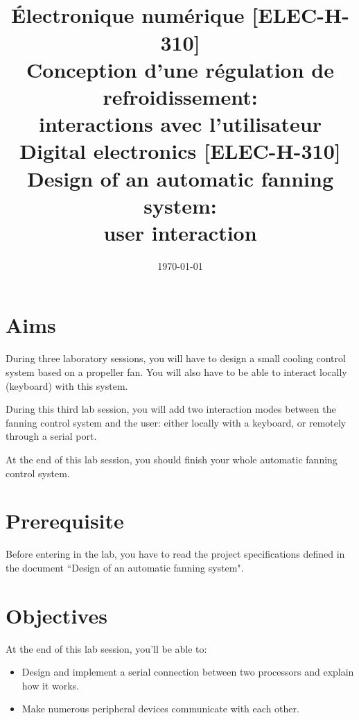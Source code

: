 \documentclass[11pt,a4paper]{article}
\date{\vspace{-1.7cm}\mydate\today}
\title{\vspace{-2cm}\labonumber\\ Électronique numérique [ELEC-H-310]\\Conception d'une régulation de refroidissement: \\ interactions avec l'utilisateur\ifthenelse{\boolean{corrige}}{~\\Corrigé}{}}
\title{\vspace{-2cm}\labonumber \\ Digital electronics [ELEC-H-310]\\Design of an automatic fanning system: \\ user interaction\ifthenelse{\boolean{corrige}}{~\\Corrigé}{}}
\theoremstyle{definition}%
\begin{document}
\pagestyle{empty}
\maketitle





\section*{Aims}
During three laboratory sessions, you will have to design a small cooling control system based on a propeller fan.
You will also have to be able to interact locally (keyboard) with this system.

During this third lab session, you will add two interaction modes between the fanning control system and the user: either locally with a keyboard, or remotely through a serial port.

At the end of this lab session, you should finish your whole automatic fanning control system.


\section*{Prerequisite}
Before entering in the lab, you have to read the project specifications defined in the document ``Design of an automatic fanning system".



\section*{Objectives}
At the end of this lab session, you'll be able to:
\begin{itemize}
	\item Design and implement a serial connection between two processors and explain how it works.
	\item Make numerous peripheral devices communicate with each other.
\end{itemize}


\newpage





\end{document}
